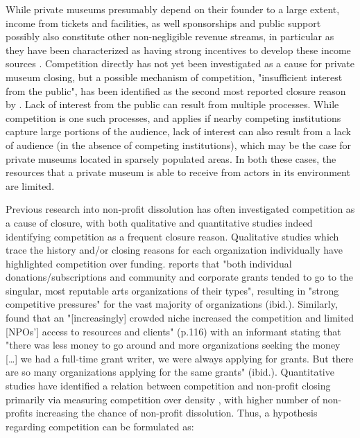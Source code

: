\documentclass[12pt]{article}
\begin{document}
While private museums presumably depend on their founder to a large extent, income from tickets and facilities, as well sponsorships and public support possibly also constitute other non-negligible revenue streams, in particular as they have been characterized as having strong incentives to develop these income sources \parencite{Frey_Meier_2002_beyeler}.
Competition directly has not yet been investigated as a cause for private museum closing, but a possible mechanism of competition, "insufficient interest from the public", has been identified as the second most reported closure reason by \textcite[p.6]{Velthuis_Gera_2024_fragility}. 
Lack of interest from the public can result from multiple processes.
While competition is one such processes, and applies if nearby competing institutions capture large portions of the audience, lack of interest can also result from a lack of audience (in the absence of competing institutions), which may be the case for private museums located in sparsely populated areas.
In both these cases, the resources that a private museum is able to receive from actors in its environment are limited. 



Previous research into non-profit dissolution has often investigated competition as a cause of closure, with both qualitative and quantitative studies indeed identifying competition as a frequent closure reason.
Qualitative studies which trace the history and/or closing reasons for each organization individually have highlighted competition over funding.
\textcite{Hager_1999_demise} reports that "both individual donations/subscriptions and community and corporate grants tended to go to the singular, most reputable arts organizations of their types", resulting in "strong competitive pressures" for the vast majority of organizations (ibid.).
Similarly, \textcite{HernandezOrtiz_2022_discontinuity} found that an "[increasingly] crowded niche increased the competition and limited [NPOs'] access to resources and clients" (p.116) with an informant stating that "there was less money to go around and more organizations seeking the money [\ldots{}] we had a full-time grant writer, we were always applying for grants. But there are so many organizations applying for the same grants" (ibid.).
Quantitative studies have identified a relation between competition and non-profit closing primarily via measuring competition over density \parencite{Park_Shon_Lu_2021_mortality,Haugh_etal_2021_nascent,Lu_Shon_Zhang_2019_dissolution}, with higher number of non-profits increasing the chance of non-profit dissolution.
Thus, a hypothesis regarding competition can be formulated as:
\end{document}
